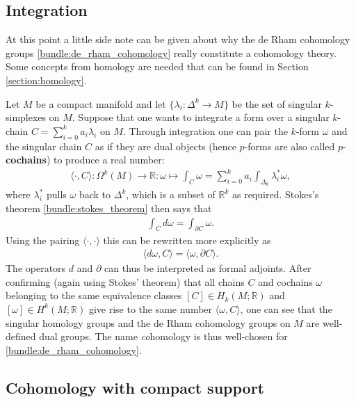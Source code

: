\subsection{Integration}

    At this point a little side note can be given about why the de Rham cohomology groups \ref{bundle:de_rham_cohomology} really constitute a cohomology theory. Some concepts from homology are needed that can be found in Section \ref{section:homology}.

    Let $M$ be a compact manifold and let $\{\lambda_i:\Delta^k\rightarrow M\}$ be the set of singular $k$-simplexes on $M$. Suppose that one wants to integrate a form over a singular $k$-chain $C = \sum_{i=0}^ka_i\lambda_i$ on $M$. Through integration one can pair the $k$-form $\omega$ and the singular chain $C$ as if they are dual objects (hence $p$-forms are also called $p$-\textbf{cochains}) to produce a real number:
    \begin{gather}
        \langle\cdot,C\rangle:\Omega^k(M)\rightarrow\mathbb{R}:\omega\mapsto\int_C\omega = \sum_{i=0}^ka_i\int_{\Delta_k}\lambda_i^*\omega,
    \end{gather}
    where $\lambda_i^*$ pulls $\omega$ back to $\Delta^k$, which is a subset of $\mathbb{R}^k$ as required. Stokes's theorem \ref{bundle:stokes_theorem} then says that
    \begin{gather}
        \int_Cd\omega = \int_{\partial C}\omega.
    \end{gather}
    Using the pairing $\langle\cdot,\cdot\rangle$ this can be rewritten more explicitly as
    \begin{gather}
        \langle d\omega,C \rangle = \langle\omega,\partial C\rangle.
    \end{gather}
    The operators $d$ and $\partial$ can thus be interpreted as formal adjoints. After confirming (again using Stokes' theorem) that all chains $C$ and cochains $\omega$ belonging to the same equivalence classes $[C]\in H_k(M;\mathbb{R})$ and $[\omega]\in H^k(M;\mathbb{R})$ give rise to the same number $\langle\omega,C\rangle$, one can see that the singular homology groups and the de Rham cohomology groups on $M$ are well-defined dual groups. The name \textit{co}homology is thus well-chosen for \ref{bundle:de_rham_cohomology}.

\subsection{Cohomology with compact support}


